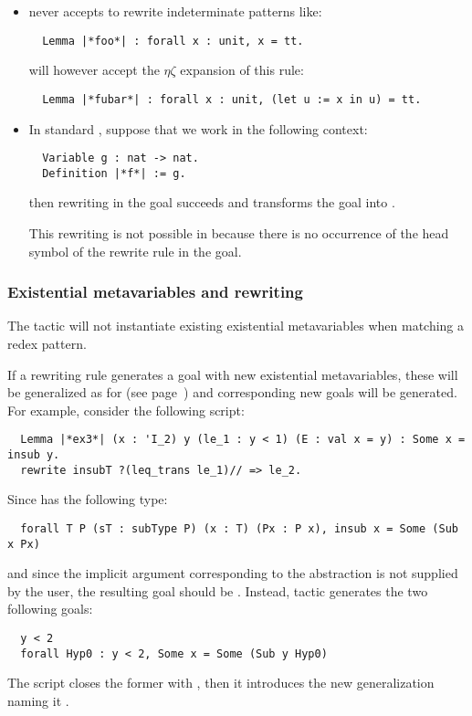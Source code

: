 \begin{itemize}
\item \ssr{} never accepts to rewrite indeterminate patterns like:
\begin{lstlisting}
  Lemma |*foo*| : forall x : unit, x = tt.
\end{lstlisting}
\ssr{} will however accept the $\eta\zeta$ expansion of this rule:
\begin{lstlisting}
  Lemma |*fubar*| : forall x : unit, (let u := x in u) = tt.
\end{lstlisting}
\item In standard \Coq{}, suppose that we work in the following context:
\begin{lstlisting}
  Variable g : nat -> nat.
  Definition |*f*| := g.
\end{lstlisting}
then rewriting  in the goal
 succeeds
and transforms the goal into .

This rewriting is not possible in \ssr{} because there is no
occurrence of the head symbol  of the rewrite rule in the goal.
\end{itemize}

\subsubsection*{Existential metavariables and rewriting}
\label{ssec:rewcaveats}
The  tactic will not instantiate existing existential
metavariables when matching a redex pattern.

If a rewriting rule generates a goal
with new existential metavariables, these will be generalized as for  
(see page~\pageref{sssec:apply}) and corresponding new goals will be generated.
For example, consider the following script:

\begin{lstlisting}
  Lemma |*ex3*| (x : 'I_2) y (le_1 : y < 1) (E : val x = y) : Some x = insub y.
  rewrite insubT ?(leq_trans le_1)// => le_2.
\end{lstlisting}

Since  has the following type:

\begin{lstlisting}
  forall T P (sT : subType P) (x : T) (Px : P x), insub x = Some (Sub x Px)
\end{lstlisting}

and since the implicit argument corresponding to the  abstraction is not
supplied by the user, the resulting goal should be . Instead, \ssr{}  tactic generates the two following 
goals: 
\begin{lstlisting}
  y < 2
  forall Hyp0 : y < 2, Some x = Some (Sub y Hyp0)
\end{lstlisting}
The script closes the former with , then it introduces
the new generalization naming it .

